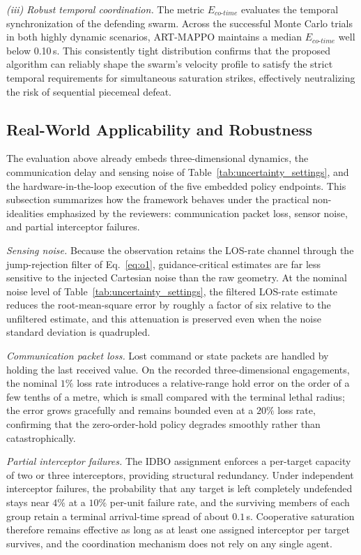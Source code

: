 \documentclass[lettersize,journal]{IEEEtran}
\newcommand{\hladd}[1]{{\color{blue}#1}}
\begin{document}
\emph{(iii) Robust temporal coordination.} The metric $E_{co\text{-}time}$ evaluates the temporal synchronization of the defending swarm. Across the successful Monte Carlo trials in both highly dynamic scenarios, ART-MAPPO maintains a median $E_{co\text{-}time}$ well below 0.10\,s. This consistently tight distribution confirms that the proposed algorithm can reliably shape the swarm's velocity profile to satisfy the strict temporal requirements for simultaneous saturation strikes, effectively neutralizing the risk of sequential piecemeal defeat.

\subsection{\hladd{Real-World Applicability and Robustness}}
\label{subsec:robustness}

\hladd{The evaluation above already embeds three-dimensional dynamics, the communication delay
and sensing noise of Table~\ref{tab:uncertainty_settings}, and the hardware-in-the-loop
execution of the five embedded policy endpoints. This subsection summarizes how the framework
behaves under the practical non-idealities emphasized by the reviewers: communication packet
loss, sensor noise, and partial interceptor failures.}

\hladd{\emph{Sensing noise.} Because the observation retains the LOS-rate channel through the
jump-rejection filter of Eq.~\eqref{eq:o1}, guidance-critical estimates are far less sensitive to
the injected Cartesian noise than the raw geometry. At the nominal noise level of
Table~\ref{tab:uncertainty_settings}, the filtered LOS-rate estimate reduces the root-mean-square
error by roughly a factor of six relative to the unfiltered estimate, and this attenuation is
preserved even when the noise standard deviation is quadrupled.}

\hladd{\emph{Communication packet loss.} Lost command or state packets are handled by holding the
last received value. On the recorded three-dimensional engagements, the nominal $1\%$ loss rate
introduces a relative-range hold error on the order of a few tenths of a metre, which is small
compared with the terminal lethal radius; the error grows gracefully and remains bounded even at
a $20\%$ loss rate, confirming that the zero-order-hold policy degrades smoothly rather than
catastrophically.}

\hladd{\emph{Partial interceptor failures.} The IDBO assignment enforces a per-target capacity of
two or three interceptors, providing structural redundancy. Under independent interceptor
failures, the probability that any target is left completely undefended stays near $4\%$ at a
$10\%$ per-unit failure rate, and the surviving members of each group retain a terminal
arrival-time spread of about $0.1$\,s. Cooperative saturation therefore remains effective as long
as at least one assigned interceptor per target survives, and the coordination mechanism does not
rely on any single agent.}
\end{document}
